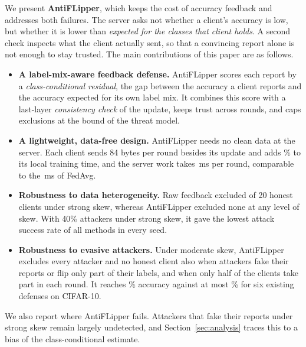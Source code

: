 \documentclass[conference]{IEEEtran}
\begin{document}
We present \textbf{AntiFLipper}, which keeps the cost of accuracy feedback and addresses both failures. The server asks not whether a client's accuracy is low, but whether it is lower than \emph{expected for the classes that client holds}. A second check inspects what the client actually sent, so that a convincing report alone is not enough to stay trusted. The main contributions of this paper are as follows.
\begin{itemize}
\item \textbf{A label-mix-aware feedback defense.} AntiFLipper scores each report by a \emph{class-conditional residual}, the gap between the accuracy a client reports and the accuracy expected for its own label mix. It combines this score with a last-layer \emph{consistency check} of the update, keeps trust across rounds, and caps exclusions at the bound of the threat model.
\item \textbf{A lightweight, data-free design.} AntiFLipper needs no clean data at the server. Each client sends 84 bytes per round besides its update and adds \evalOverhead\% to its local training time, and the server work takes \matchedOurs\,ms per round, comparable to the \matchedFedAvg\,ms of FedAvg.
\item \textbf{Robustness to data heterogeneity.} Raw feedback excluded \cleanHonRaw{} of 20 honest clients under strong skew, whereas AntiFLipper excluded none at any level of skew. With 40\% attackers under strong skew, it gave the lowest attack success rate of all methods in every seed.
\item \textbf{Robustness to evasive attackers.} Under moderate skew, AntiFLipper excludes every attacker and no honest client also when attackers fake their reports or flip only part of their labels, and when only half of the clients take part in each round. It reaches \headAcc\% accuracy against at most \headAccFLTrust\% for six existing defenses on CIFAR-10.
\end{itemize}
We also report where AntiFLipper fails. Attackers that fake their reports under strong skew remain largely undetected, and Section~\ref{sec:analysis} traces this to a bias of the class-conditional estimate.

\end{document}
